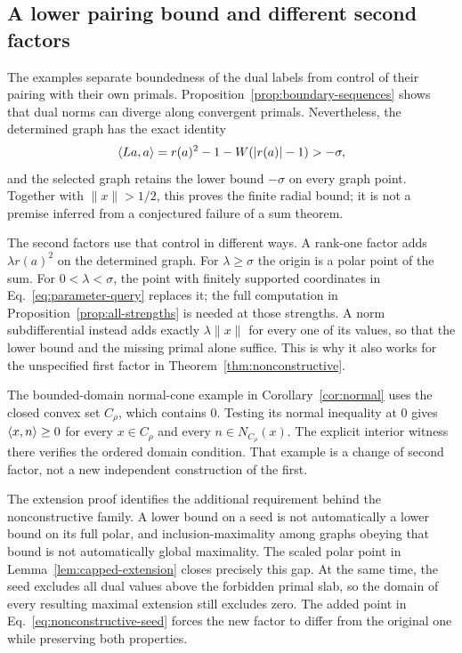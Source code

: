 \subsection{A lower pairing bound and different second factors}
The examples separate boundedness of the dual labels from control of
their pairing with their own primals. Proposition~\ref{prop:boundary-sequences}
shows that dual norms can diverge along convergent primals. Nevertheless,
the determined graph has the exact identity
\[
\langle La,a\rangle=r(a)^2-1-W(|r(a)|-1)>-\sigma,
\]
and the selected graph retains the lower bound $-\sigma$ on every graph point.
Together with $\|x\|>1/2$, this proves the finite radial bound; it is
not a premise inferred from a conjectured failure of a sum theorem.

The second factors use that control in different ways. A rank-one factor
adds $\lambda r(a)^2$ on the determined graph. For $\lambda\ge\sigma$
the origin is a polar point of the sum. For $0<\lambda<\sigma$, the
point with finitely supported coordinates in Eq.~\eqref{eq:parameter-query} replaces it;
the full computation in Proposition~\ref{prop:all-strengths} is needed
at those strengths. A norm subdifferential instead adds exactly
$\lambda\|x\|$ for every one of its values, so that the lower bound
and the missing primal alone suffice. This is why it also works for
the unspecified first factor in Theorem~\ref{thm:nonconstructive}.

The bounded-domain normal-cone example in Corollary~\ref{cor:normal}
uses the closed convex set $C_\rho$, which contains $0$. Testing its
normal inequality at $0$ gives $\langle x,n\rangle\ge0$ for every
$x\in C_\rho$ and every $n\in N_{C_\rho}(x)$. The explicit interior
witness there verifies the ordered domain condition. That example is a change
of second factor, not a new independent construction of the first.


The extension proof identifies the additional requirement behind the
nonconstructive family. A lower bound on a seed is not automatically a
lower bound on its full polar, and inclusion-maximality among graphs
obeying that bound is not automatically global maximality. The scaled
polar point in Lemma~\ref{lem:capped-extension} closes precisely this
gap. At the same time, the seed excludes all dual values above the
forbidden primal slab, so the domain of every resulting maximal extension
still excludes zero. The added point in Eq.~\eqref{eq:nonconstructive-seed} forces the
new factor to differ from the original one while preserving both
properties.

